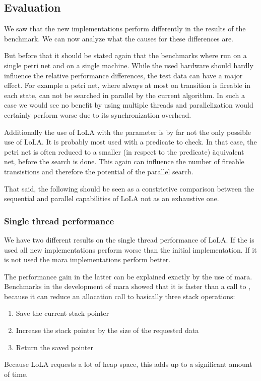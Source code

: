 \subsection{Evaluation}
\label{evaluation}
We saw that the new implementations perform differently in the results of the benchmark. We can now analyze what the causes for these differences are.

But before that it should be stated again that the benchmarks where run on a single petri net and on a single machine. While the used hardware should hardly influence the relative performance differences, the test data can have a major effect. For example a petri net, where always at most on transition is fireable in each state, can not be searched in parallel by the current algorithm. In such a case we would see no benefit by using multiple threads and parallelization would certainly perform worse due to its synchronization overhead.

Additionally the use of LoLA with the  parameter is by far not the only possible use of LoLA. It is probably most used with a predicate to check. In that case, the petri net is often reduced to a smaller (in respect to the predicate) äquivalent net, before the search is done. This again can influence the number of fireable transistions and therefore the potential of the parallel search.

That said, the following should be seen as a constrictive comparison between the sequential and parallel capabilities of LoLA not as an exhaustive one.

\subsubsection{Single thread performance}
\label{evalSingleThread}
We have two different results on the single thread performance of LoLA. If the  is used all new implementations perform worse than the initial implementation. If it is not used the mara implementations perform better.

The performance gain in the latter can be explained exactly by the use of mara. Benchmarks in the development of mara showed that it is faster than a call to , because it can reduce an allocation call to basically three stack operations:
\begin{enumerate}
    \item Save the current stack pointer
    \item Increase the stack pointer by the size of the requested data
    \item Return the saved pointer
\end{enumerate}
Because LoLA requests a lot of heap space, this adds up to a significant amount of time.

